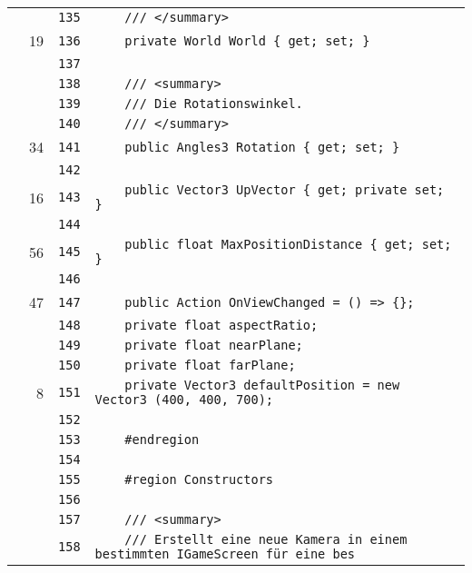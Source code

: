 \documentclass[a4paper,10pt]{article}
\begin{document}
\begin{longtable}[l]{lrrl}
\cellcolor{gray} &  & \verb~135~ & \verb~    /// </summary>~\\
\cellcolor{green} & 19 & \verb~136~ & \verb~    private World World { get; set; }~\\
\cellcolor{gray} &  & \verb~137~ & \verb~~\\
\cellcolor{gray} &  & \verb~138~ & \verb~    /// <summary>~\\
\cellcolor{gray} &  & \verb~139~ & \verb~    /// Die Rotationswinkel.~\\
\cellcolor{gray} &  & \verb~140~ & \verb~    /// </summary>~\\
\cellcolor{green} & 34 & \verb~141~ & \verb~    public Angles3 Rotation { get; set; }~\\
\cellcolor{gray} &  & \verb~142~ & \verb~~\\
\cellcolor{green} & 16 & \verb~143~ & \verb~    public Vector3 UpVector { get; private set; }~\\
\cellcolor{gray} &  & \verb~144~ & \verb~~\\
\cellcolor{green} & 56 & \verb~145~ & \verb~    public float MaxPositionDistance { get; set; }~\\
\cellcolor{gray} &  & \verb~146~ & \verb~~\\
\cellcolor{green} & 47 & \verb~147~ & \verb~    public Action OnViewChanged = () => {};~\\
\cellcolor{gray} &  & \verb~148~ & \verb~    private float aspectRatio;~\\
\cellcolor{gray} &  & \verb~149~ & \verb~    private float nearPlane;~\\
\cellcolor{gray} &  & \verb~150~ & \verb~    private float farPlane;~\\
\cellcolor{green} & 8 & \verb~151~ & \verb~    private Vector3 defaultPosition = new Vector3 (400, 400, 700);~\\
\cellcolor{gray} &  & \verb~152~ & \verb~~\\
\cellcolor{gray} &  & \verb~153~ & \verb~    #endregion~\\
\cellcolor{gray} &  & \verb~154~ & \verb~~\\
\cellcolor{gray} &  & \verb~155~ & \verb~    #region Constructors~\\
\cellcolor{gray} &  & \verb~156~ & \verb~~\\
\cellcolor{gray} &  & \verb~157~ & \verb~    /// <summary>~\\
\cellcolor{gray} &  & \verb~158~ & \verb~    /// Erstellt eine neue Kamera in einem bestimmten IGameScreen für eine bes~\\

\end{longtable}
\end{document}
